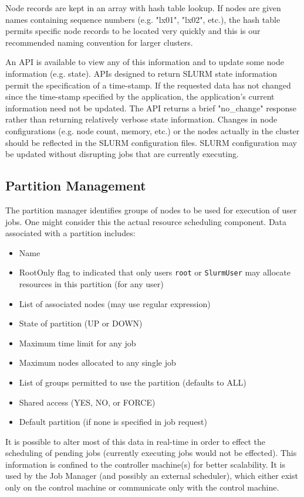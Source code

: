Node records are kept in an array with hash table lookup. 
If nodes are given names containing sequence numbers (e.g. "lx01", "lx02", 
etc.), the hash table permits specific node records to be located 
very quickly and this is our recommended naming convention for larger 
clusters.

An API is available to view any of this information and to update some 
node information (e.g. state). APIs designed to return SLURM
state information permit the specification of a time-stamp.  If the
requested data has not changed since the time-stamp specified by the
application, the application's current information need not be updated.
The API returns a brief "no\_change" response rather than returning
relatively verbose state information.
Changes in node configurations (e.g. node count, memory, etc.) or the nodes 
actually in the cluster should be reflected in the SLURM configuration 
files. SLURM configuration may be updated without disrupting jobs 
that are currently executing.

\subsection{Partition Management}

The partition manager identifies groups of nodes to be used for
execution of user jobs. One might consider this the actual resource 
scheduling component. 
Data associated with a partition includes:
\begin{itemize}
\item Name
\item RootOnly flag to indicated that only users {\tt root} or 
{\tt SlurmUser} may allocate resources in this partition (for any user)
\item List of associated nodes (may use regular expression)
\item State of partition (UP or DOWN)
\item Maximum time limit for any job
\item Maximum nodes allocated to any single job
\item List of groups permitted to use the partition (defaults to ALL)
\item Shared access (YES, NO, or FORCE)
\item Default partition (if none is specified in job request)
\end{itemize}

It is possible to alter most of this data in real-time in order
to effect the scheduling of pending jobs (currently executing jobs
would not be effected).  This information is confined to the controller
machine(s) for better scalability.  It is used by the Job Manager
(and possibly an external scheduler), which either exist only on the
control machine or communicate only with the control machine. 

